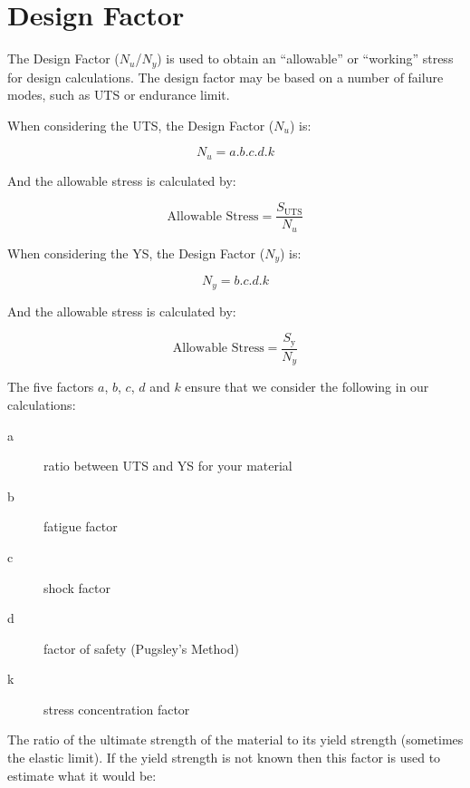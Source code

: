 \section{Design Factor}\label{sec:DF}

The Design Factor (\(N_u\)/\(N_y\)) is used to obtain an ``allowable'' or ``working'' stress for design calculations. The design factor may be based on a number of failure modes, such as \ac{UTS} or endurance limit.

When considering the \ac{UTS}, the Design Factor (\(N_u\)) is:

\begin{equation}
  N_u = a.b.c.d.k 
\end{equation}

And the allowable stress is calculated by:

\begin{equation}
  \text{Allowable Stress} = \frac{S_\text{UTS}}{N_u}
\end{equation}

When considering the \acf{YS}, the Design Factor (\(N_y\)) is:

\begin{equation}
  N_y = b.c.d.k
\end{equation}

And the allowable stress is calculated by:

\begin{equation}
  \text{Allowable Stress} = \frac{S_\text{y}}{N_y} 
\end{equation}

The five factors \(a\), \(b\), \(c\), \(d\) and \(k\) ensure that we consider the following in our calculations: 

\begin{description}
  \item[a] ratio between \ac{UTS} and \ac{YS} for your material
  \item[b] fatigue factor
  \item[c] shock factor
  \item[d] factor of safety (Pugsley's Method)
  \item[k] stress concentration factor
\end{description}

The ratio of the ultimate strength of the material to its yield strength (sometimes the elastic limit). If the yield strength is not known then this factor is used to estimate what it would be:

